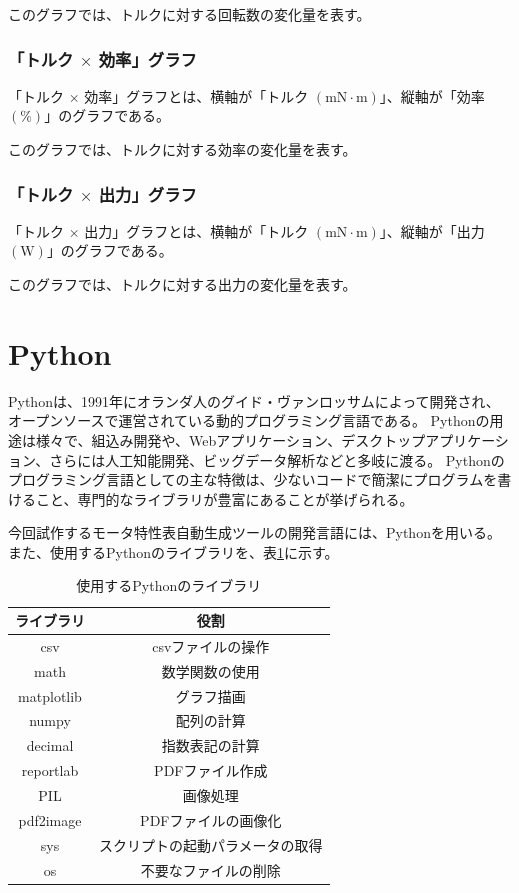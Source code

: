 このグラフでは、トルクに対する回転数の変化量を表す。
\subsubsection{「トルク $\times$ 効率」グラフ}\label{sub:sub:torkouritu}
「トルク $\times$ 効率」グラフとは、横軸が「トルク $(\mathrm{mN \cdot m})$」、縦軸が「効率 $(\mathrm{\%})$」のグラフである。

このグラフでは、トルクに対する効率の変化量を表す。
\subsubsection{「トルク $\times$ 出力」グラフ}\label{sub:sub:torsyutu}
「トルク $\times$ 出力」グラフとは、横軸が「トルク $(\mathrm{mN \cdot m})$」、縦軸が「出力 $(\mathrm{W})$」のグラフである。

このグラフでは、トルクに対する出力の変化量を表す。
\section{Python}\label{python}
Pythonは、1991年にオランダ人のグイド・ヴァンロッサムによって開発され、オープンソースで運営されている動的プログラミング言語である\cite{pythonoya}。
Pythonの用途は様々で、組込み開発や、Webアプリケーション、デスクトップアプリケーション、さらには人工知能開発、ビッグデータ解析などと多岐に渡る\cite{pythonsamu}。
Pythonのプログラミング言語としての主な特徴は、少ないコードで簡潔にプログラムを書けること、専門的なライブラリが豊富にあることが挙げられる。

今回試作するモータ特性表自動生成ツールの開発言語には、Pythonを用いる。
また、使用するPythonのライブラリを、表\ref{tab:libr}に示す。
\begin{table}[t]
	\centering
	\caption{使用するPythonのライブラリ}
	\begin{tabular}{|c|c|} \hline
	  ライブラリ & 役割\\ \hline \hline
	  csv & csvファイルの操作 \\ \hline
	  math &  数学関数の使用\\ \hline
	  matplotlib & グラフ描画\\ \hline
	  numpy &  配列の計算\\ \hline
	  decimal &  指数表記の計算\\ \hline
	  reportlab & PDFファイル作成 \\ \hline
	  PIL &  画像処理\\ \hline
	  pdf2image &  PDFファイルの画像化\\ \hline
	  sys & スクリプトの起動パラメータの取得\\ \hline
	  os &  不要なファイルの削除\\ \hline
	\end{tabular}
	\label{tab:libr}
  \end{table}

